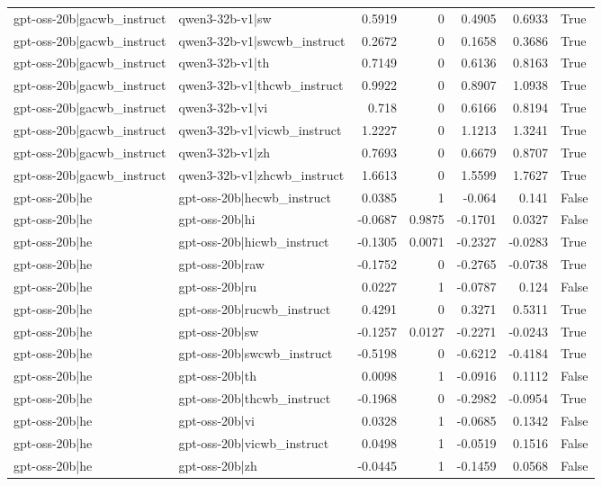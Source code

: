 \begin{table}
\begin{tabular}{l l r r r r l}
gpt-oss-20b|gacwb_instruct & qwen3-32b-v1|sw & 0.5919 & 0 & 0.4905 & 0.6933 & True \\
gpt-oss-20b|gacwb_instruct & qwen3-32b-v1|swcwb_instruct & 0.2672 & 0 & 0.1658 & 0.3686 & True \\
gpt-oss-20b|gacwb_instruct & qwen3-32b-v1|th & 0.7149 & 0 & 0.6136 & 0.8163 & True \\
gpt-oss-20b|gacwb_instruct & qwen3-32b-v1|thcwb_instruct & 0.9922 & 0 & 0.8907 & 1.0938 & True \\
gpt-oss-20b|gacwb_instruct & qwen3-32b-v1|vi & 0.718 & 0 & 0.6166 & 0.8194 & True \\
gpt-oss-20b|gacwb_instruct & qwen3-32b-v1|vicwb_instruct & 1.2227 & 0 & 1.1213 & 1.3241 & True \\
gpt-oss-20b|gacwb_instruct & qwen3-32b-v1|zh & 0.7693 & 0 & 0.6679 & 0.8707 & True \\
gpt-oss-20b|gacwb_instruct & qwen3-32b-v1|zhcwb_instruct & 1.6613 & 0 & 1.5599 & 1.7627 & True \\
gpt-oss-20b|he & gpt-oss-20b|hecwb_instruct & 0.0385 & 1 & -0.064 & 0.141 & False \\
gpt-oss-20b|he & gpt-oss-20b|hi & -0.0687 & 0.9875 & -0.1701 & 0.0327 & False \\
gpt-oss-20b|he & gpt-oss-20b|hicwb_instruct & -0.1305 & 0.0071 & -0.2327 & -0.0283 & True \\
gpt-oss-20b|he & gpt-oss-20b|raw & -0.1752 & 0 & -0.2765 & -0.0738 & True \\
gpt-oss-20b|he & gpt-oss-20b|ru & 0.0227 & 1 & -0.0787 & 0.124 & False \\
gpt-oss-20b|he & gpt-oss-20b|rucwb_instruct & 0.4291 & 0 & 0.3271 & 0.5311 & True \\
gpt-oss-20b|he & gpt-oss-20b|sw & -0.1257 & 0.0127 & -0.2271 & -0.0243 & True \\
gpt-oss-20b|he & gpt-oss-20b|swcwb_instruct & -0.5198 & 0 & -0.6212 & -0.4184 & True \\
gpt-oss-20b|he & gpt-oss-20b|th & 0.0098 & 1 & -0.0916 & 0.1112 & False \\
gpt-oss-20b|he & gpt-oss-20b|thcwb_instruct & -0.1968 & 0 & -0.2982 & -0.0954 & True \\
gpt-oss-20b|he & gpt-oss-20b|vi & 0.0328 & 1 & -0.0685 & 0.1342 & False \\
gpt-oss-20b|he & gpt-oss-20b|vicwb_instruct & 0.0498 & 1 & -0.0519 & 0.1516 & False \\
gpt-oss-20b|he & gpt-oss-20b|zh & -0.0445 & 1 & -0.1459 & 0.0568 & False \\

\end{tabular}
\end{table}
